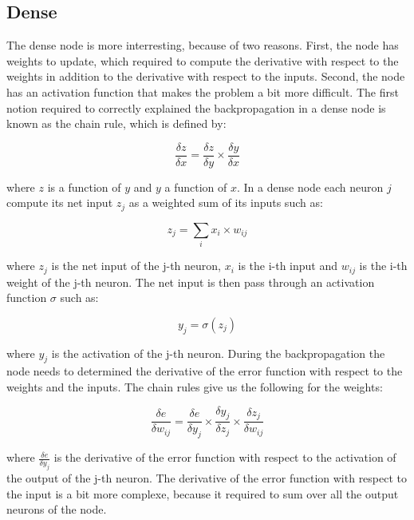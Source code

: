 \documentclass[11pt]{report}
\begin{document}
\subsection{Dense}

The dense node is more interresting, because of two reasons. First, the node has weights to update, which required to compute the derivative with respect to the weights in addition to the derivative with respect to the inputs. Second, the node has an activation function that makes the problem a bit more difficult. The first notion required to correctly explained the backpropagation in a dense node is known as the chain rule, which is defined by:

\begin{equation}
\frac{\delta z}{\delta x} = \frac{\delta z}{\delta y} \times \frac{\delta y}{\delta x}
\end{equation}

\noindent where $z$ is a function of $y$ and $y$ a function of $x$. In a dense node each neuron $j$ compute its net input $z_j$ as a weighted sum of its inputs such as:

\begin{equation}
z_j = \sum_{i}{x_i \times w_{ij}}
\end{equation}

\noindent where $z_j$ is the net input of the j-th neuron, $x_i$ is the i-th input and $w_{ij}$ is the i-th weight of the j-th neuron. The net input is then pass through an activation function $\sigma$ such as:

\begin{equation}
y_j = \sigma(z_j)
\end{equation}

\noindent where $y_j$ is the activation of the j-th neuron. During the backpropagation the node needs to determined the derivative of the error function with respect to the weights and the inputs. The chain rules give us the following for the weights:

\begin{equation}
\frac{\delta e}{\delta w_{ij}} = \frac{\delta e}{\delta y_j} \times \frac{\delta y_j}{\delta z_j} \times \frac{\delta z_j}{\delta w_{ij}}
\end{equation}

\noindent where $\frac{\delta e}{\delta y_j}$ is the derivative of the error function with respect to the activation of the output of the j-th neuron. The derivative of the error function with respect to the input is a bit more complexe, because it required to sum over all the output neurons of the node.
\end{document}
